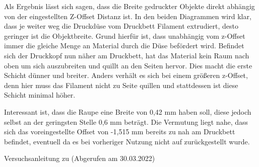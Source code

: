\documentclass[a4paper,12pt,bibtotocnumbered]{scrartcl}
\numberwithin{equation}{section} %
\begin{document}
Als Ergebnis lässt sich sagen, dass die Breite gedruckter Objekte direkt abhängig von der eingestellten Z-Offset Distanz ist. In den beiden Diagrammen wird klar, dass je weiter weg die Druckdüse vom Druckbett Filament extrudiert, desto geringer ist die Objektbreite. Grund hierfür ist, dass unabhängig vom z-Offset immer die gleiche Menge an Material durch die Düse befördert wird. Befindet sich der Druckkopf nun näher am Druckbett, hat das Material kein Raum nach oben um sich auszubreiten und quillt an den Seiten hervor. Dies macht die erste Schicht dünner und breiter. Anders verhält es sich bei einem größeren z-Offset, denn hier muss das Filament nicht zu Seite quillen und stattdessen ist diese Schicht minimal höher.

Interessant ist, dass die Raupe eine Breite von 0,42 mm haben soll, diese jedoch selbst an der geringsten Stelle 0,6 mm beträgt. Die Vermutung liegt nahe, dass sich das voreingestellte Offset von -1,515 mm bereits zu nah am Druckbett befindet, eventuell da es bei vorheriger Nutzung nicht auf zurückgestellt wurde.

\newpage
\begin{thebibliography}{999}
 Versuchsanleitung zu (Abgerufen am 30.03.2022) 
\end{thebibliography}




%
\end{document}
